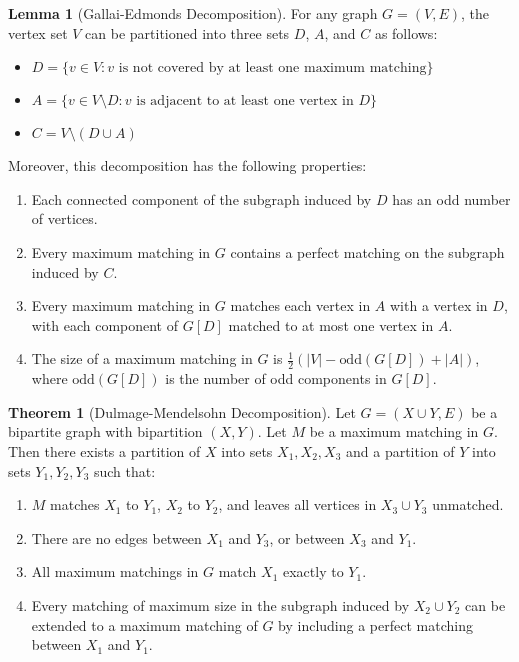 \documentclass{article}
\theoremstyle{definition}
\newtheorem{theorem}{Theorem}
\newtheorem{lemma}{Lemma}
\begin{document}
\begin{lemma}[Gallai-Edmonds Decomposition]
For any graph $G = (V, E)$, the vertex set $V$ can be partitioned into three sets $D$, $A$, and $C$ as follows:
\begin{itemize}
  \item $D = \{v \in V : v \text{ is not covered by at least one maximum matching}\}$
  \item $A = \{v \in V \setminus D : v \text{ is adjacent to at least one vertex in } D\}$
  \item $C = V \setminus (D \cup A)$
\end{itemize}

Moreover, this decomposition has the following properties:
\begin{enumerate}
  \item Each connected component of the subgraph induced by $D$ has an odd number of vertices.
  \item Every maximum matching in $G$ contains a perfect matching on the subgraph induced by $C$.
  \item Every maximum matching in $G$ matches each vertex in $A$ with a vertex in $D$, with each component of $G[D]$ matched to at most one vertex in $A$.
  \item The size of a maximum matching in $G$ is $\frac{1}{2}(|V| - \text{odd}(G[D]) + |A|)$, where $\text{odd}(G[D])$ is the number of odd components in $G[D]$.
\end{enumerate}
\end{lemma}

\begin{theorem}[Dulmage-Mendelsohn Decomposition]
Let $G = (X \cup Y, E)$ be a bipartite graph with bipartition $(X, Y)$. Let $M$ be a maximum matching in $G$. Then there exists a partition of $X$ into sets $X_1, X_2, X_3$ and a partition of $Y$ into sets $Y_1, Y_2, Y_3$ such that:
\begin{enumerate}
  \item $M$ matches $X_1$ to $Y_1$, $X_2$ to $Y_2$, and leaves all vertices in $X_3 \cup Y_3$ unmatched.
  \item There are no edges between $X_1$ and $Y_3$, or between $X_3$ and $Y_1$.
  \item All maximum matchings in $G$ match $X_1$ exactly to $Y_1$.
  \item Every matching of maximum size in the subgraph induced by $X_2 \cup Y_2$ can be extended to a maximum matching of $G$ by including a perfect matching between $X_1$ and $Y_1$.
\end{enumerate}
\end{theorem}
\end{document}

